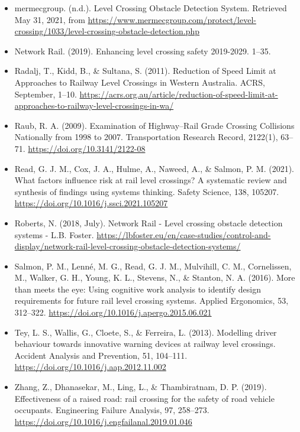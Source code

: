 \documentclass[
]{book}
\begin{document}
\begin{itemize}
\item
  mermecgroup. (n.d.). Level Crossing Obstacle Detection System. Retrieved May 31, 2021, from \url{https://www.mermecgroup.com/protect/level-crossing/1033/level-crossing-obstacle-detection.php}
\item
  Network Rail. (2019). Enhancing level crossing safety 2019-2029. 1--35.
\item
  Radalj, T., Kidd, B., \& Sultana, S. (2011). Reduction of Speed Limit at Approaches to Railway Level Crossings in Western Australia. ACRS, September, 1--10. \url{https://acrs.org.au/article/reduction-of-speed-limit-at-approaches-to-railway-level-crossings-in-wa/}
\item
  Raub, R. A. (2009). Examination of Highway--Rail Grade Crossing Collisions Nationally from 1998 to 2007. Transportation Research Record, 2122(1), 63--71. \url{https://doi.org/10.3141/2122-08}
\item
  Read, G. J. M., Cox, J. A., Hulme, A., Naweed, A., \& Salmon, P. M. (2021). What factors influence risk at rail level crossings? A systematic review and synthesis of findings using systems thinking. Safety Science, 138, 105207. \url{https://doi.org/10.1016/j.ssci.2021.105207}
\item
  Roberts, N. (2018, July). Network Rail - Level crossing obstacle detection systems - L.B. Foster. \url{https://lbfoster.eu/en/case-studies/control-and-display/network-rail-level-crossing-obstacle-detection-systems/}
\item
  Salmon, P. M., Lenné, M. G., Read, G. J. M., Mulvihill, C. M., Cornelissen, M., Walker, G. H., Young, K. L., Stevens, N., \& Stanton, N. A. (2016). More than meets the eye: Using cognitive work analysis to identify design requirements for future rail level crossing systems. Applied Ergonomics, 53, 312--322. \url{https://doi.org/10.1016/j.apergo.2015.06.021}
\item
  Tey, L. S., Wallis, G., Cloete, S., \& Ferreira, L. (2013). Modelling driver behaviour towards innovative warning devices at railway level crossings. Accident Analysis and Prevention, 51, 104--111. \url{https://doi.org/10.1016/j.aap.2012.11.002}
\item
  Zhang, Z., Dhanasekar, M., Ling, L., \& Thambiratnam, D. P. (2019). Effectiveness of a raised road: rail crossing for the safety of road vehicle occupants. Engineering Failure Analysis, 97, 258--273. \url{https://doi.org/10.1016/j.engfailanal.2019.01.046}
\end{itemize}
\end{document}

